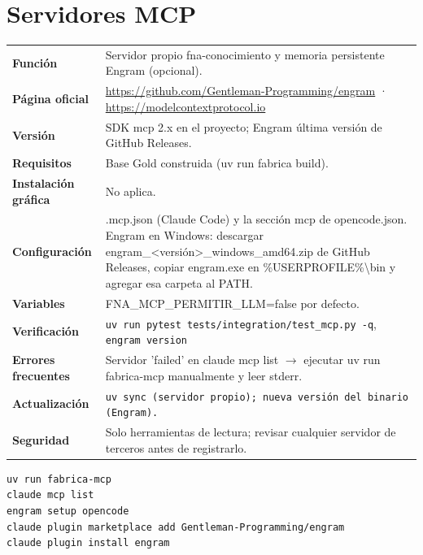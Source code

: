\section{Servidores MCP}
{\small\begin{tabularx}{\linewidth}{@{}>{\bfseries}p{2.9cm}X@{}}\toprule
Función & Servidor propio fna-conocimiento y memoria persistente Engram (opcional).\\
Página oficial & \url{https://github.com/Gentleman-Programming/engram} · \url{https://modelcontextprotocol.io}\\
Versión & SDK mcp 2.x en el proyecto; Engram última versión de GitHub Releases.\\
Requisitos & Base Gold construida (uv run fabrica build).\\
Instalación gráfica & No aplica.\\
Configuración & .mcp.json (Claude Code) y la sección mcp de opencode.json. Engram en Windows: descargar engram\_\textless{}versión\textgreater{}\_windows\_amd64.zip de GitHub Releases, copiar engram.exe en \%USERPROFILE\%\textbackslash{}bin y agregar esa carpeta al PATH.\\
Variables & FNA\_MCP\_PERMITIR\_LLM=false por defecto.\\
Verificación & \texttt{uv run pytest tests/integration/test\_mcp.py -q}, \texttt{engram version}\\
Errores frecuentes & Servidor 'failed' en claude mcp list $\rightarrow$ ejecutar uv run fabrica-mcp manualmente y leer stderr.\\
Actualización & \texttt{uv sync (servidor propio); nueva versión del binario (Engram).}\\
Seguridad & Solo herramientas de lectura; revisar cualquier servidor de terceros antes de registrarlo.\\
\bottomrule\end{tabularx}}
\begin{lstlisting}[style=ps]
uv run fabrica-mcp
claude mcp list
engram setup opencode
claude plugin marketplace add Gentleman-Programming/engram
claude plugin install engram
\end{lstlisting}

